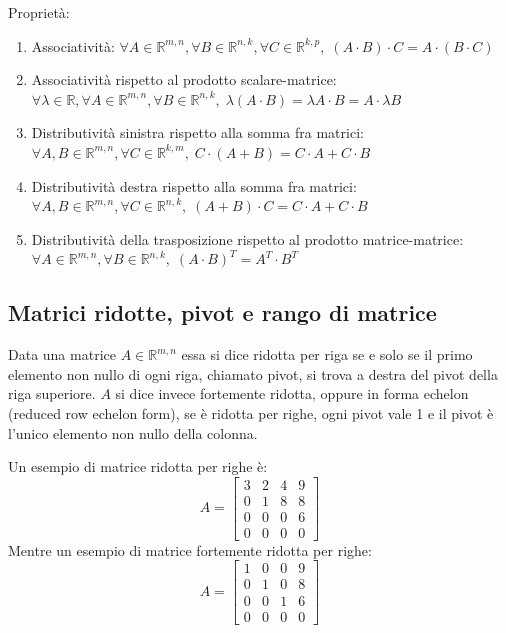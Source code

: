 \documentclass{article}
\begin{document}
    \vspace{10pt}
    Proprietà:
    \begin{enumerate}[label=(\arabic*)]
        \item Associatività: $\forall A \in \mathbb{R}^{m, n}, \forall B \in \mathbb{R}^{n, k}, \forall C \in \mathbb{R}^{k, p}, \; (A \cdot B) \cdot C = A \cdot (B \cdot C)$ 
        \item Associatività rispetto al prodotto scalare-matrice: $\forall \lambda \in \mathbb{R}, \forall A \in \mathbb{R}^{m, n}, \forall B \in \mathbb{R}^{n, k}, \; \lambda (A \cdot B) = \lambda A \cdot B = A \cdot \lambda B$
        \item Distributività sinistra rispetto alla somma fra matrici: $\forall A, B \in \mathbb{R}^{m, n}, \forall C \in \mathbb{R}^{k, m}, \; C \cdot (A + B) = C \cdot A + C \cdot B$
        \item Distributività destra rispetto alla somma fra matrici: $\forall A, B \in \mathbb{R}^{m, n}, \forall C \in \mathbb{R}^{n, k}, \; (A + B) \cdot C = C \cdot A + C \cdot B$
        \item Distributività della trasposizione rispetto al prodotto matrice-matrice: $\forall A \in \mathbb{R}^{m, n}, \forall B \in \mathbb{R}^{n, k}, \; (A \cdot B)^{T} = A^{T} \cdot B^{T}$
    \end{enumerate}

\subsection{Matrici ridotte, pivot e rango di matrice}
    Data una matrice $A \in \mathbb{R}^{m, n}$ essa si dice ridotta per riga se e solo se il primo elemento non nullo
    di ogni riga, chiamato pivot, si trova a destra del pivot della riga superiore. $A$ si dice invece fortemente ridotta,
    oppure in forma echelon (reduced row echelon form), se è ridotta per righe, ogni pivot vale 1 e il pivot è l'unico elemento non nullo della colonna. 

    \vspace{10pt}
    Un esempio di matrice ridotta per righe è:
    \[
        A = 
        \begin{bmatrix}
            3 & 2 & 4 & 9 \\
            0 & 1 & 8 & 8 \\
            0 & 0 & 0 & 6 \\
            0 & 0 & 0 & 0 
        \end{bmatrix} 
    \]
    Mentre un esempio di matrice fortemente ridotta per righe: 
    \[
        A = 
        \begin{bmatrix}
            1 & 0 & 0 & 9 \\
            0 & 1 & 0 & 8 \\
            0 & 0 & 1 & 6 \\
            0 & 0 & 0 & 0 
        \end{bmatrix} 
    \]
\end{document}
